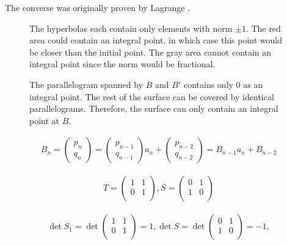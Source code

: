 The converse was originally proven by Lagrange \cite{Lagrange70}.

\begin{figure}[tb]
  \centering
  
  \caption{
    The hyperbolas each contain only elements with norm $±1$.
    The red area could contain an integral point, in which case this point
    would be closer than the initial point.
    The gray area cannot contain an integral point since the norm would be
    fractional.
  }
\end{figure}

\begin{figure}[tb]
  \centering
  
  \caption{
    The parallelogram spanned by $B$ and $B'$ contains only $0$ as an integral point.
    The rest of the surface can be covered by identical parallelograms.
    Therefore, the surface can only contain an integral point at $B$.
  }
\end{figure}

\begin{align*}
  B_n =
  \begin{pmatrix}
    p_n \\ q_n
  \end{pmatrix}
  =
  \begin{pmatrix}
    p_{n-1} \\ q_{n-1}
  \end{pmatrix}
  a_n
  +
  \begin{pmatrix}
    p_{n-2} \\ q_{n-2}
  \end{pmatrix}
  = B_{n-1} a_n + B_{n-2}
\end{align*}

\begin{align*}
  T = \begin{pmatrix}
    1 & 1 \\
    0 & 1 \\
  \end{pmatrix},
  S = \begin{pmatrix}
    0 & 1 \\
    1 & 0 \\
  \end{pmatrix}
\end{align*}

\begin{align*}
  \det S_1 = \det\begin{pmatrix}
    1 & 1 \\
    0 & 1 \\
  \end{pmatrix} = 1,
  \det S = \det\begin{pmatrix}
    0 & 1 \\
    1 & 0 \\
  \end{pmatrix} = -1,
\end{align*}

